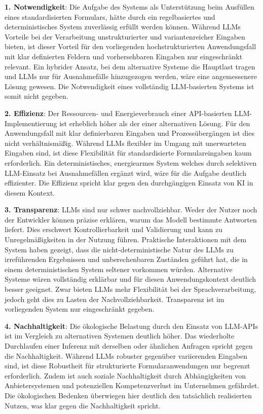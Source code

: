 \begin{description}[noitemsep,topsep=5pt]
    \item \textbf{1. Notwendigkeit}: Die Aufgabe des Systems als Unterstützung beim Ausfüllen eines standardisierten Formulars, hätte durch ein regelbasiertes und deterministisches System zuverlässig erfüllt werden können. Während LLMs Vorteile bei der Verarbeitung unstrukturierter und variantenreicher Eingaben bieten, ist dieser Vorteil für den vorliegenden hochstrukturierten Anwendungsfall mit klar definierten Feldern und vorhersehbaren Eingaben nur eingeschränkt relevant. Ein hybrider Ansatz, bei dem alternative Systeme die Hauptlast tragen und LLMs nur für Ausnahmefälle hinzugezogen werden, wäre eine angemessenere Lösung gewesen. Die Notwendigkeit eines vollständig LLM-basierten Systems ist somit nicht gegeben.
    
    \item \textbf{2. Effizienz}: Der Ressourcen- und Energieverbrauch einer API-basierten LLM-Implementierung ist erheblich höher als der einer alternativen Lösung. Für den Anwendungsfall mit klar definierbaren Eingaben und Prozessübergängen ist dies nicht verhältnismäßig. Während LLMs flexibler im Umgang mit unerwarteten Eingaben sind, ist diese Flexibilität für standardisierte Formulareingaben kaum erforderlich. Ein deterministisches, energiearmes System welches durch selektiven LLM-Einsatz bei Ausnahmefällen ergänzt wird, wäre für die Aufgabe deutlich effizienter. Die Effizienz spricht klar gegen den durchgängigen Einsatz von KI in diesem Kontext.
    
    \item \textbf{3. Transparenz}: LLMs sind nur schwer nachvollziehbar. Weder der Nutzer noch der Entwickler können präzise erklären, warum das Modell bestimmte Antworten liefert. Dies erschwert Kontrollierbarkeit und Validierung und kann zu Unregelmäßigkeiten in der Nutzung führen. Praktische Interaktionen mit dem System haben gezeigt, dass die nicht-deterministische Natur des LLMs zu irreführenden Ergebnissen und unberechenbaren Zuständen geführt hat, die in einem deterministischen System seltener vorkommen würden. Alternative Systeme wären vollständig erklärbar und für diesen Anwendungskontext deutlich besser geeignet. Zwar bieten LLMs mehr Flexibilität bei der Sprachverarbeitung, jedoch geht dies zu Lasten der Nachvollziehbarkeit. Transparenz ist im vorliegenden System nur eingeschränkt gegeben.
    
    \item \textbf{4. Nachhaltigkeit}: Die ökologische Belastung durch den Einsatz von LLM-APIs ist im Vergleich zu alternativen Systemen deutlich höher. Das wiederholte Durchlaufen einer Inferenz mit derselben oder ähnlichen Anfragen spricht gegen die Nachhaltigkeit. Während LLMs robuster gegenüber variierenden Eingaben sind, ist diese Robustheit für strukturierte Formularanwendungen nur begrenzt erforderlich. Zudem ist auch soziale Nachhaltigkeit durch Abhängigkeiten von Anbietersystemen und potenziellen Kompetenzverlust im Unternehmen gefährdet. Die ökologischen Bedenken überwiegen hier deutlich den tatsächlich realisierten Nutzen, was klar gegen die Nachhaltigkeit spricht.
    

\end{description}
